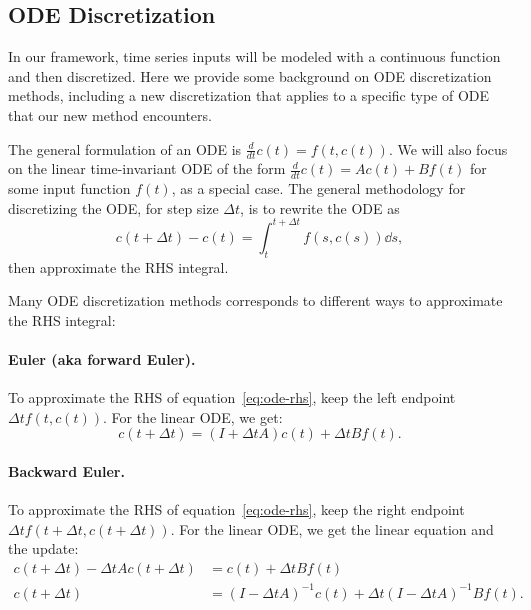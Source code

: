 \documentclass[../hippo.tex]{subfiles}
\begin{document}
\subsection{ODE Discretization}
\label{sec:discretization-full}

In our framework, time series inputs will be modeled with a continuous function and then discretized.
Here we provide some background on ODE discretization methods,
including a new discretization that applies to a specific type of ODE that our new method encounters.

The general formulation of an ODE is $\frac{d}{dt} c(t) = f(t, c(t))$.
We will also focus on the linear time-invariant ODE of the form $\frac{d}{dt} c(t) = A c(t) + Bf(t)$
for some input function $f(t)$, as a special case.
The general methodology for discretizing the ODE, for step size $\Delta t$, is to
rewrite the ODE as
\begin{equation}
  \label{eq:ode-rhs}
  c(t + \Delta t) - c(t) = \int_t^{t+\Delta t} f(s, c(s)) \dd s,
\end{equation}
then approximate the RHS integral.

Many ODE discretization methods corresponds to different ways to
approximate the RHS integral:

\paragraph{Euler (aka forward Euler).}
To approximate the RHS of equation~\eqref{eq:ode-rhs}, keep the left endpoint
$\Delta t f(t, c(t))$.
For the linear ODE, we get:
\begin{equation*}
  c(t + \Delta t) = (I + \Delta t A) c(t)+ \Delta t B f(t).
\end{equation*}


\paragraph{Backward Euler.}
To approximate the RHS of equation~\eqref{eq:ode-rhs}, keep the right endpoint
$\Delta t f(t+\Delta t, c(t+\Delta t))$.
For the linear ODE, we get the linear equation and the update:
\begin{align*}
  c(t + \Delta t) - \Delta t A c(t + \Delta t) &= c(t)+ \Delta t B f(t) \\
  c(t + \Delta t) &= (I - \Delta t A)^{-1} c(t) + \Delta t (I - \Delta t A)^{-1} B f(t).
\end{align*}
\end{document}
